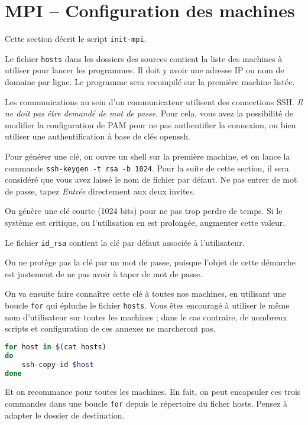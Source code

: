\section{MPI – Configuration des machines}
\label{sec:installation:machines}

Cette section décrit le script \texttt{init-mpi}.

Le fichier \texttt{hosts} dans les dossiers des sources contient la
liste des machines à utiliser pour lancer les programmes. Il doit y
avoir une adresse IP ou nom de domaine par ligne. Le programme sera
recompilé sur la première machine listée.

Les communications au sein d'un communicateur utilisent des
connections SSH. \emph{Il ne doit pas être demandé de mot de
  passe}. Pour cela, vous avez la possibilité de modifier la
configuration de PAM pour ne pas authentifier la connexion, ou bien
utiliser une authentification à base de clés openssh.

Pour générer une clé, on ouvre un shell sur la première machine, et on
lance la commande \texttt{ssh-keygen -t rsa -b 1024}. Pour la suite de
cette section, il sera considéré que vous avez laissé le nom de
fichier par défaut. Ne pas entrer de mot de passe, tapez \emph{Entrée}
directement aux deux invites.

On génère une clé courte (1024 bits) pour ne pas trop perdre de
temps. Si le système est critique, ou l'utilisation en est prolongée,
augmenter cette valeur.

Le fichier \texttt{id\_rsa} contient la clé par défaut associée à
l'utilisateur.

On ne protège pas la clé par un mot de passe, puisque l'objet de cette
démarche est justement de ne pas avoir à taper de mot de passe.

On va ensuite faire connaître cette clé à toutes nos machines, en
utilisant une boucle \texttt{for} qui épluche le fichier
\texttt{hosts}. Vous êtes encouragé à utiliser le même nom
d'utilisateur sur toutes les machines ; dans le cas contraire, de
nombreux scripts et configuration de ces annexes ne marcheront pas.

\begin{lstlisting}[language=bash]
for host in $(cat hosts)
do
    ssh-copy-id $host
done
\end{lstlisting}

Et on recommance pour toutes les machines. En fait, on peut encapsuler
ces trois commandes dans une boucle \texttt{for} depuis le répertoire
du ficher hosts. Pensez à adapter le dossier de destination.


